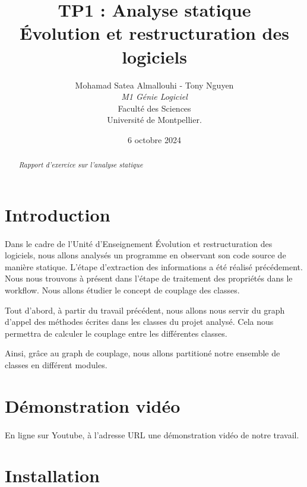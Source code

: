 \documentclass[a4paper]{article}
\title{  TP1 : Analyse statique\\Évolution et restructuration des logiciels}
\author{Mohamad Satea Almallouhi - Tony Nguyen\\\emph{M1 Génie Logiciel}\\Faculté des Sciences\\Université de Montpellier.}
\date{6 octobre 2024}
\begin{document}
    \maketitle
    \begin{center}
    \end{center}

    \begin{abstract}     %
      \emph{Rapport d'exercice sur l'analyse statique}
    \end{abstract}
    \newpage
    \tableofcontents
    \section*{Introduction}
            \paragraph{}
                Dans le cadre de l'Unité d'Enseignement Évolution et restructuration des logiciels, nous allons analysés un programme en observant son code source de manière statique. L'étape d'extraction des informations a été réalisé précédement. Nous nous trouvons à présent dans l'étape de traitement des propriétés dans le workflow. Nous allons étudier le concept de couplage des classes.

                Tout d'abord, à partir du travail précédent, nous allons nous servir du graph d'appel des méthodes écrites dans les classes du projet analysé. Cela nous permettra de calculer le couplage entre les différentes classes.

                Ainsi, grâce au graph de couplage, nous allons partitioné notre ensemble de classes en différent modules.
        \section*{Démonstration vidéo}
            \paragraph{}
                En ligne sur Youtube, à l'adresse URL 
                une démonstration vidéo de notre travail.
        \section*{Installation}
\end{document}
